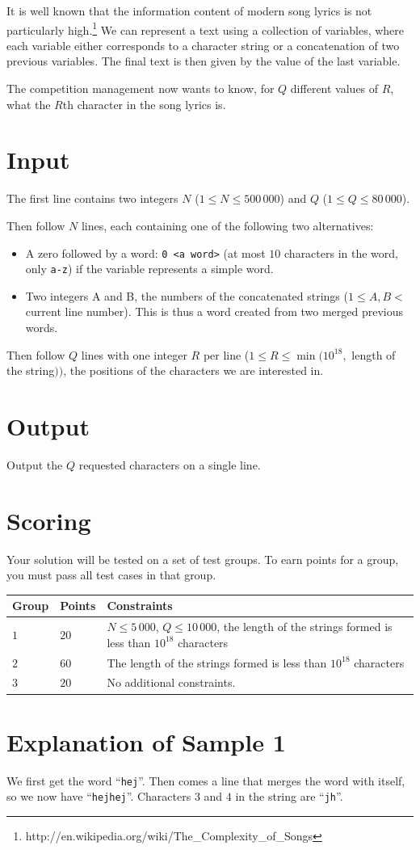 It is well known that the information content of modern song lyrics is not particularly
high.\footnote{http://en.wikipedia.org/wiki/The\_Complexity\_of\_Songs}
We can represent a text using a collection of variables, where each
variable either corresponds to a character string or a concatenation of two
previous variables. The final text is then given by the value of the last
variable.

The competition management now wants to know, for $Q$ different values of $R$, what the $R$th character in
the song lyrics is.

\section*{Input}

The first line contains two integers $N$ ($1 \leq N \leq 500\,000$) and $Q$ ($1 \leq Q
\leq 80\,000$).

Then follow $N$ lines, each containing one of the following two alternatives:

\begin{itemize}
\item A zero followed by a word: \texttt{0 <a word>} (at most $10$ characters in
      the word, only \texttt{a-z}) if the variable represents a simple word.
\item Two integers A and B, the numbers of the concatenated strings
      ($1 \leq A, B < $ current line number). This is thus a word created
      from two merged previous words.
\end{itemize}

Then follow $Q$ lines with one integer $R$ per line ($1 \leq R \leq \min(10^{18},$ length of
the string$))$, the positions of the characters we are interested in.

\section*{Output}

Output the $Q$ requested characters on a single line.

\section*{Scoring}
Your solution will be tested on a set of test groups.
To earn points for a group, you must pass all test cases in that group.

\noindent
\begin{tabular}{| l | l | l |}
  \hline
  \textbf{Group} & \textbf{Points} & \textbf{Constraints} \\ \hline
  $1$   & $20$       & $N \leq 5\,000$, $Q \leq 10\,000$, the length of the strings formed is less than $10^{18}$ characters \\ \hline
  $2$   & $60$       & The length of the strings formed is less than $10^{18}$ characters \\ \hline
  $3$   & $20$       & No additional constraints. \\ \hline
\end{tabular}

\section*{Explanation of Sample 1}
We first get the word ``\texttt{hej}''. Then comes a line that merges
the word with itself, so we now have ``\texttt{hejhej}''. Characters $3$ and $4$ in the string are ``\texttt{jh}''.
